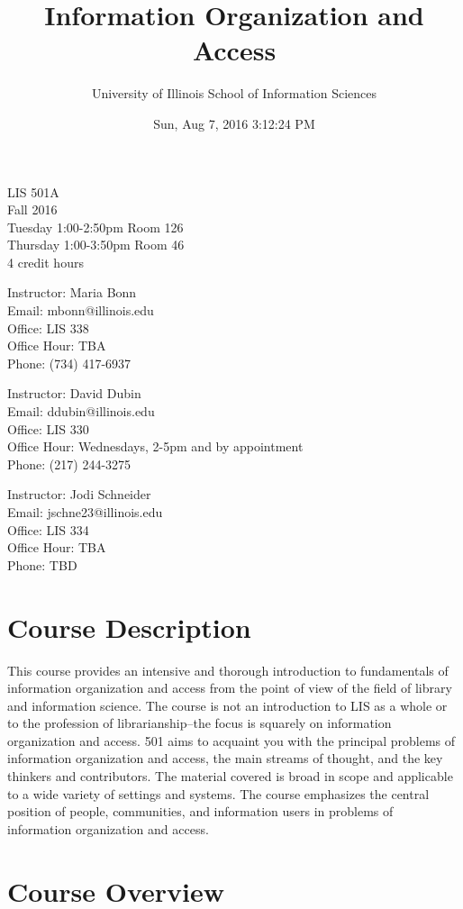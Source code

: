 \documentclass[]{article}
\title{Information Organization and Access}
\author{University of Illinois School of Information Sciences}
\date{Sun, Aug 7, 2016 3:12:24 PM}
\begin{document}
\maketitle

LIS 501A\\
Fall 2016\\
Tuesday 1:00-2:50pm Room 126\\
Thursday 1:00-3:50pm Room 46\\
4 credit hours

Instructor: Maria Bonn\\
Email: mbonn@illinois.edu\\
Office: LIS 338\\
Office Hour: TBA\\
Phone: (734) 417-6937

Instructor: David Dubin\\
Email: ddubin@illinois.edu\\
Office: LIS 330\\
Office Hour: Wednesdays, 2-5pm and by appointment\\
Phone: (217) 244-3275

Instructor: Jodi Schneider\\
Email: jschne23@illinois.edu\\
Office: LIS 334\\
Office Hour: TBA\\
Phone: TBD

\section{Course Description}\label{course-description}

This course provides an intensive and thorough introduction to
fundamentals of information organization and access from the point of
view of the field of library and information science. The course is not
an introduction to LIS as a whole or to the profession of
librarianship--the focus is squarely on information organization and
access. 501 aims to acquaint you with the principal problems of
information organization and access, the main streams of thought, and
the key thinkers and contributors. The material covered is broad in
scope and applicable to a wide variety of settings and systems. The
course emphasizes the central position of people, communities, and
information users in problems of information organization and access.

\section{Course Overview}\label{course-overview}
\end{document}
